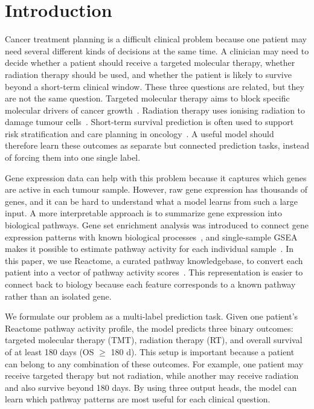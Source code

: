 \documentclass[sigconf]{acmart}
\begin{document}

\maketitle
\thispagestyle{onlyconf}
\pagestyle{onlyconf}
\section{Introduction}

Cancer treatment planning is a difficult clinical problem because one
patient may need several different kinds of decisions at the same time. A
clinician may need to decide whether a patient should receive a targeted
molecular therapy, whether radiation therapy should be used, and whether
the patient is likely to survive beyond a short-term clinical window. These
three questions are related, but they are not the same question. Targeted
molecular therapy aims to block specific molecular drivers of cancer
growth~\cite{Min2022}. Radiation therapy uses ionising radiation to damage
tumour cells~\cite{Baskar2012}. Short-term survival prediction is often used
to support risk stratification and care planning in oncology~\cite{Parikh2019,
SideyGibbons2022}. A useful model should therefore learn these outcomes as
separate but connected prediction tasks, instead of forcing them into one
single label.

Gene expression data can help with this problem because it captures which
genes are active in each tumour sample. However, raw gene expression has
thousands of genes, and it can be hard to understand what a model learns
from such a large input. A more interpretable approach is to summarize gene
expression into biological pathways. Gene set enrichment analysis was
introduced to connect gene expression patterns with known biological
processes~\cite{subramanian2005gsea}, and single-sample GSEA makes it
possible to estimate pathway activity for each individual
sample~\cite{barbie2009ssgsea}. In this paper, we use Reactome, a curated
pathway knowledgebase, to convert each patient into a vector of pathway
activity scores~\cite{gillespie2022reactome}. This representation is easier
to connect back to biology because each feature corresponds to a known
pathway rather than an isolated gene.

We formulate our problem as a multi-label prediction task. Given one
patient's Reactome pathway activity profile, the model predicts three binary
outcomes: targeted molecular therapy (TMT), radiation therapy (RT), and
overall survival of at least 180 days (OS $\geq$ 180 d). This setup is
important because a patient can belong to any combination of these outcomes.
For example, one patient may receive targeted therapy but not radiation,
while another may receive radiation and also survive beyond 180 days. By
using three output heads, the model can learn which pathway patterns are
most useful for each clinical question.
\end{document}
